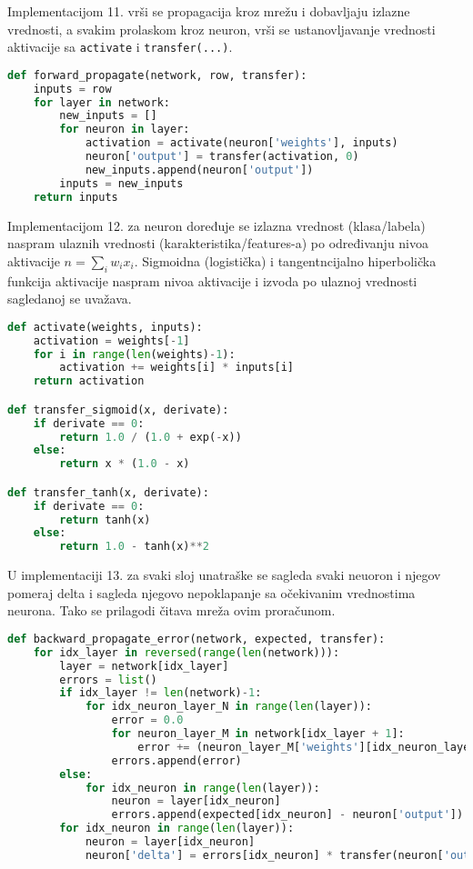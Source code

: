 \documentclass[fontsize=11bp, paper=a4]{scrarticle}
\begin{document}
Implementacijom 11. vrši se propagacija kroz mrežu i dobavljaju izlazne vrednosti, a svakim prolaskom kroz neuron, vrši se ustanovljavanje vrednosti aktivacije sa \verb|activate| i \verb|transfer(...)|.

\begin{lstlisting}[language=Python, caption=\texttt{forward\_propagate}]
def forward_propagate(network, row, transfer):
	inputs = row
	for layer in network:
		new_inputs = []
		for neuron in layer:
			activation = activate(neuron['weights'], inputs)
			neuron['output'] = transfer(activation, 0)
			new_inputs.append(neuron['output'])
		inputs = new_inputs
	return inputs
\end{lstlisting}

Implementacijom 12. za neuron doređuje se izlazna vrednost (klasa/labela) naspram ulaznih vrednosti (karakteristika/features-a) po određivanju nivoa aktivacije $n = \sum_i w_i x_i$. Sigmoidna (logistička) i tangentncijalno hiperbolička funkcija aktivacije naspram nivoa aktivacije i izvoda po ulaznoj vrednosti sagledanoj se uvažava.
\begin{lstlisting}[language=Python, caption=\texttt{activate, transfer\_sigmoid, transfer\_tanh}]
def activate(weights, inputs):
	activation = weights[-1]
	for i in range(len(weights)-1):
		activation += weights[i] * inputs[i]
	return activation

def transfer_sigmoid(x, derivate):
    if derivate == 0:
        return 1.0 / (1.0 + exp(-x))
    else:
        return x * (1.0 - x)

def transfer_tanh(x, derivate):
    if derivate == 0:
        return tanh(x)
    else:
        return 1.0 - tanh(x)**2
\end{lstlisting}

U implementaciji 13. za svaki sloj unatraške se sagleda svaki neuoron i njegov pomeraj delta i sagleda njegovo nepoklapanje sa očekivanim vrednostima neurona. Tako se prilagodi čitava mreža ovim proračunom.

\begin{lstlisting}[language=Python, caption=\texttt{backward\_propagate\_error}]
def backward_propagate_error(network, expected, transfer):
    for idx_layer in reversed(range(len(network))):
        layer = network[idx_layer]
        errors = list()
        if idx_layer != len(network)-1:
            for idx_neuron_layer_N in range(len(layer)):
                error = 0.0 
                for neuron_layer_M in network[idx_layer + 1]:
                    error += (neuron_layer_M['weights'][idx_neuron_layer_N] * neuron_layer_M['delta'])
                errors.append(error)
        else:
            for idx_neuron in range(len(layer)):
                neuron = layer[idx_neuron]
                errors.append(expected[idx_neuron] - neuron['output'])
        for idx_neuron in range(len(layer)):
            neuron = layer[idx_neuron]
            neuron['delta'] = errors[idx_neuron] * transfer(neuron['output'], 1)
\end{lstlisting}
\end{document}
